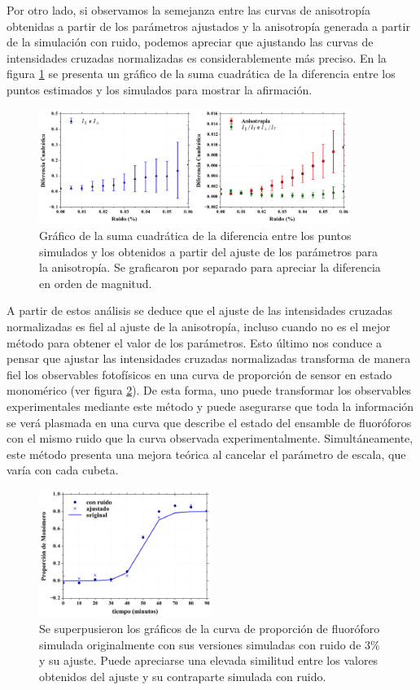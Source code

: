Por otro lado, si observamos la semejanza entre las curvas de anisotropía obtenidas a partir de los parámetros ajustados y la anisotropía generada a partir de la simulación con ruido, podemos apreciar que ajustando las curvas de intensidades cruzadas normalizadas es considerablemente más preciso. En la figura \ref{fig:Ajuste_chi_a} se presenta un gráfico de la suma cuadrática de la diferencia entre los puntos estimados y los simulados para mostrar la afirmación. 
\begin{figure}
\centering
    \includegraphics[width=0.9\textwidth]{./img/Ajuste_chi_a.png}
    \caption{Gráfico de la suma cuadrática de la diferencia entre los puntos simulados y los obtenidos a partir del ajuste de los parámetros para la anisotropía. Se graficaron por separado para apreciar la diferencia en orden de magnitud.}
    \label{fig:Ajuste_chi_a}
\end{figure}

A partir de estos análisis se deduce que el ajuste de las intensidades cruzadas normalizadas es fiel al ajuste de la anisotropía, incluso cuando no es el mejor método para obtener el valor de los parámetros. Esto último nos conduce a pensar que ajustar las intensidades cruzadas normalizadas transforma de manera fiel los observables fotofísicos en una curva de proporción de sensor en estado monomérico (ver figura \ref{fig:todos_ms}). De esta forma, uno puede transformar los observables experimentales mediante este método y puede asegurarse que toda la información se verá plasmada en una curva que describe el estado del ensamble de fluoróforos con el mismo ruido que la curva observada experimentalmente. Simultáneamente, este método presenta una mejora teórica al cancelar el parámetro de escala, que varía con cada cubeta.

\begin{figure}
\centering
    \includegraphics[width=0.5\textwidth]{./img/todos_ms.png}
    \caption{Se superpusieron los gráficos de la curva de proporción de fluoróforo simulada originalmente con sus versiones simuladas con ruido de 3$\%$ y su ajuste. Puede apreciarse una elevada similitud entre los valores obtenidos del ajuste y su contraparte simulada con ruido.}
    \label{fig:todos_ms}
\end{figure}

